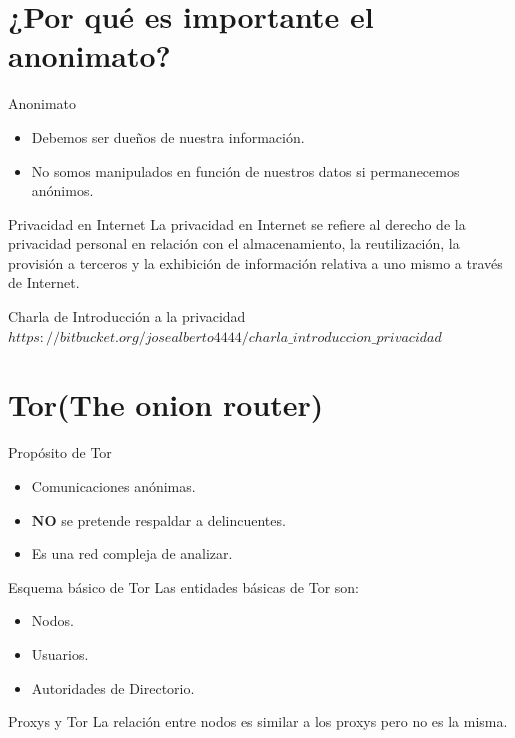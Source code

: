 \documentclass[10pt]{beamer}
\begin{document}
\section{¿Por qué es importante el anonimato?}

\begin{frame}{Anonimato}
	\begin{itemize}
		\item Debemos ser dueños de nuestra información. \pause
		\item No somos manipulados en función de nuestros datos si permanecemos anónimos. \pause
	\end{itemize}
	\begin{block}{Privacidad en Internet}
		\pause La privacidad en Internet se refiere al derecho de la privacidad personal en relación con el almacenamiento, la reutilización, la provisión a terceros y la exhibición de información relativa a uno mismo a través de Internet.
	\end{block}
	\pause
	\begin{alertblock}{Charla de Introducción a la privacidad}
		$https://bitbucket.org/josealberto4444/charla\_introduccion\_privacidad$
	\end{alertblock}
\end{frame}


\section{Tor(The onion router)}

\begin{frame}[fragile]{Propósito de Tor}
	\begin{itemize}
		\item<1-> Comunicaciones anónimas.
		\item<2-> $\boldsymbol{NO}$ se pretende respaldar a delincuentes.
		\item<3-> Es una red compleja de analizar.
	\end{itemize}
\end{frame}

\begin{frame}[fragile]{Esquema básico de Tor}
	\pause
	Las entidades básicas de Tor son:\pause
	\begin{itemize}
		\item<1-> Nodos.\pause
		\item<2-> Usuarios.\pause
		\item<3-> Autoridades de Directorio.
	\end{itemize}
	\pause
	\begin{alertblock}{Proxys y Tor}
		La relación entre nodos es similar a los proxys pero no es la misma.
	\end{alertblock}
\end{frame}
\end{document}

